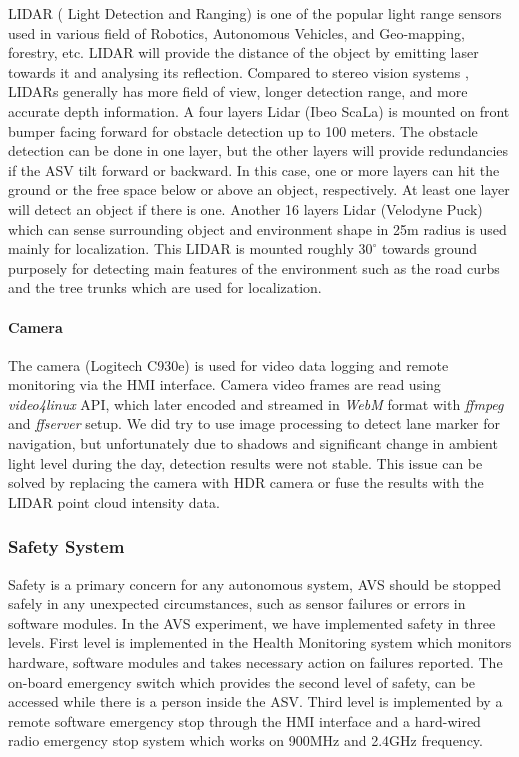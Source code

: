 \documentclass[10 pt,a4paper,conference]{IEEEtran}
\begin{document}
LIDAR ( Light Detection and Ranging) is one of the popular light range
sensors used in various field of Robotics, Autonomous Vehicles, and
Geo-mapping, forestry, etc. LIDAR will provide the distance of the
object by emitting laser towards it and analysing its reflection.
Compared to stereo vision systems \citep{6856563}, LIDARs generally has
more field of view, longer detection range, and more accurate depth
information. A four layers Lidar (Ibeo ScaLa) is mounted on front bumper
facing forward for obstacle detection up to 100 meters. The obstacle
detection can be done in one layer, but the other layers will provide
redundancies if the ASV tilt forward or backward. In this case, one or
more layers can hit the ground or the free space below or above an
object, respectively. At least one layer will detect an object if there
is one. Another 16 layers Lidar (Velodyne Puck) which can sense
surrounding object and environment shape in 25m radius is used mainly
for localization. This LIDAR is mounted roughly \(30^{\circ}\) towards
ground purposely for detecting main features of the environment such as
the road curbs and the tree trunks which are used for localization.

\paragraph{Camera}\label{camera}

The camera (Logitech C930e) is used for video data logging and remote
monitoring via the HMI interface. Camera video frames are read using
\emph{video4linux} API, which later encoded and streamed in \emph{WebM}
format with \emph{ffmpeg} and \emph{ffserver} setup. We did try to use
image processing to detect lane marker for navigation, but unfortunately
due to shadows and significant change in ambient light level during the
day, detection results were not stable. This issue can be solved by
replacing the camera with HDR camera or fuse the results with the LIDAR
point cloud intensity data.

\subsubsection{Safety System}\label{safety-system}

Safety is a primary concern for any autonomous system, AVS should be
stopped safely in any unexpected circumstances, such as sensor failures
or errors in software modules. In the AVS experiment, we have
implemented safety in three levels. First level is implemented in the
Health Monitoring system which monitors hardware, software modules and
takes necessary action on failures reported. The on-board emergency
switch which provides the second level of safety, can be accessed while
there is a person inside the ASV. Third level is implemented by a remote
software emergency stop through the HMI interface and a hard-wired radio
emergency stop system which works on 900MHz and 2.4GHz frequency.
\end{document}
